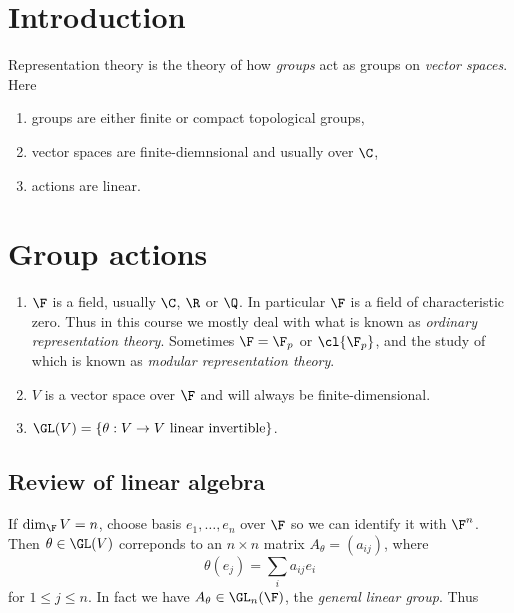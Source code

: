 \documentclass[a4paper]{article}
\theoremstyle{definition}
\begin{document}


\tableofcontents

\setcounter{section}{-1}

\section{Introduction}

Representation theory is the theory of how \emph{groups} act as groups on \emph{vector spaces}. Here
\begin{enumerate}
\item groups are either finite or compact topological groups,
\item vector spaces are finite-diemnsional and usually over \(\C\),
\item actions are linear. 
\end{enumerate}

\section{Group actions}

\begin{notation}\leavevmode
  \begin{enumerate}
  \item \(\F\) is a field, usually \(\C\), \(\R\) or \(\Q\). In particular \(\F\) is a field of characteristic zero. Thus in this course we mostly deal with what is known as \emph{ordinary representation theory}. Sometimes \(\F = \F_p\) or \(\cl{\F_p}\), and the study of which is known as \emph{modular representation theory}.
  \item \(V\) is a vector space over \(\F\) and will always be finite-dimensional.
  \item \(\GL(V) = \{\theta: V \to V \text{ linear invertible}\}\).
  \end{enumerate}
\end{notation}

\subsection{Review of linear algebra}

If \(\dim_\F V = n\), choose basis \(e_1, \dots, e_n\) over \(\F\) so we can identify it with \(\F^n\). Then \(\theta \in \GL(V)\) correponds to an \(n \times n\) matrix \(A_\theta = (a_{ij})\), where
\[
  \theta(e_j) = \sum_i a_{ij} e_i
\]
for \(1 \leq j \leq n\). In fact we have \(A_\theta \in \GL_n(\F)\), the \emph{general linear group}. Thus
\end{document}
